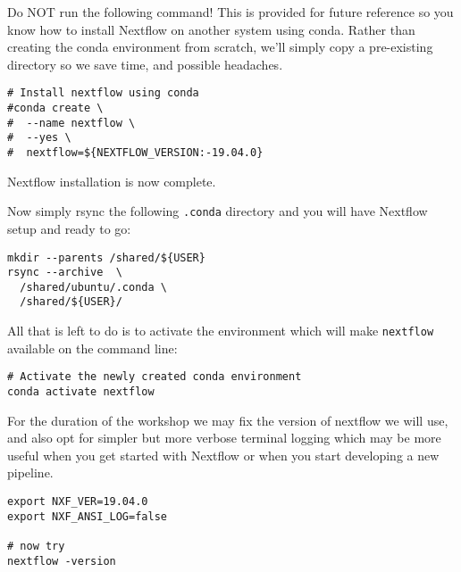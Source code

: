 \begin{warning}

Do NOT run the following command! This is provided for future reference so you know how to install Nextflow on another system using conda. Rather than
creating the conda environment from scratch, we'll simply copy a pre-existing directory so we save time, and possible headaches.

\begin{lstlisting}
# Install nextflow using conda
#conda create \
#  --name nextflow \
#  --yes \
#  nextflow=${NEXTFLOW_VERSION:-19.04.0}
\end{lstlisting}


Nextflow installation is now complete.

\end{warning}



Now simply rsync the following \texttt{.conda} directory and you
will have Nextflow setup and ready to go:


\begin{steps}
\begin{lstlisting}
mkdir --parents /shared/${USER}
rsync --archive  \
  /shared/ubuntu/.conda \
  /shared/${USER}/
\end{lstlisting}
\end{steps}

All that is left to do is to activate the environment which will make \texttt{nextflow} available on the command line:
\begin{steps}
\begin{lstlisting}
# Activate the newly created conda environment
conda activate nextflow
\end{lstlisting}

\end{steps}






For the duration of the workshop we may fix the version of nextflow we will use, 
and also opt for simpler but more verbose terminal logging 
which may be more useful when you get started with Nextflow 
or when you start developing a new pipeline.

\begin{steps}
\begin{lstlisting}
export NXF_VER=19.04.0
export NXF_ANSI_LOG=false

# now try
nextflow -version
\end{lstlisting}
\end{steps}

